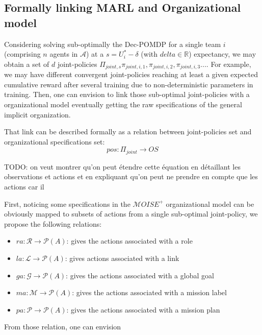 \documentclass[runningheads]{llncs}
\begin{document}
\subsection{Formally linking MARL and Organizational model}

Considering solving sub-optimally the Dec-POMDP for a single team $i$ (comprising $n$ agents in $\mathcal{A}$) at a $s = U_i^* - \delta$ (with $delta \in \mathbb{R}$) expectancy, we may obtain a set of $d$ joint-policies $\Pi_{joint,s}{\pi_{joint,i,1}, \pi_{joint,i,2}, \pi_{joint,i,3}...}$. For example, we may have different convergent joint-policies reaching at least a given expected cumulative reward after several training due to non-deterministic parameters in training. Then, one can envision to link those sub-optimal joint-policies with a organizational model eventually getting the raw specifications of the general implicit organization.

That link can be described formally as a relation between joint-policies set and organizational specifications set:
\begin{equation}
    pos: \Pi_{joint} \rightarrow OS
\end{equation}

TODO: on veut montrer qu'on peut étendre cette équation en détaillant les observations et actions et en expliquant qu'on peut ne prendre en compte que les actions car il 

First, noticing some specifications in the $\mathcal{M}OISE^+$ organizational model can be obviously mapped to subsets of actions from a single sub-optimal joint-policy, we propose the following relations:

\begin{itemize}
    \item $ra: \mathcal{R} \rightarrow \mathcal{P}(A)$: gives the actions associated with a role
    \item $la: \mathcal{L} \rightarrow \mathcal{P}(A)$: gives actions associated with a link
    \item $ga: \mathcal{G} \rightarrow \mathcal{P}(A)$: gives the actions associated with a global goal
    \item $ma: \mathcal{M} \rightarrow \mathcal{P}(A)$: gives the actions associated with a mission label
    \item $pa: \mathcal{P} \rightarrow \mathcal{P}(A)$: gives the actions associated with a mission plan
\end{itemize}

From those relation, one can envision
\end{document}
